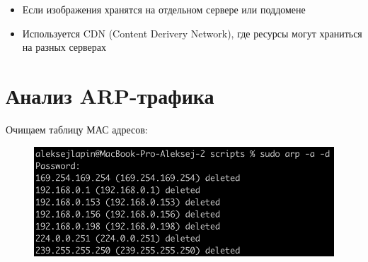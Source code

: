 \documentclass[12pt,onecolumn]{article}
\begin{document}
\begin{itemize}
{        \begin{itemize}
            \item Если изображения хранятся на отдельном сервере или поддомене
            \item Используется CDN (Content Derivery Network), где ресурсы могут
            храниться на разных серверах
        \end{itemize}
    }
\end{itemize}

\section{Анализ ARP-трафика}

Очищаем таблицу МАС адресов:

\begin{figure}[H]
    \centering
    \includegraphics*[width=\textwidth]{image/part5/arp-cmd.png}
\end{figure}
\end{document}
